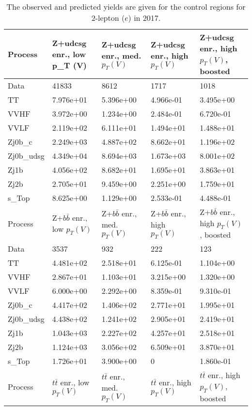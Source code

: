\begin{table}
\centering
\caption[2017 2-lepton ($e$) control region yields]{
                  The observed and predicted yields are given for the
                  control regions for 2-lepton ($e$) in 2017.
                  }
{\footnotesize
\begin{tabularx}{\textwidth}{|X|X|X|X|X|}
\hline
Process & Z+udcsg enr., low p_{T} (V) & Z+udcsg enr., med. $p_{T}(V)$ & Z+udcsg enr., high $p_{T}(V)$ & Z+udcsg enr., high $p_{T}(V)$, boosted \\
\hline
Data & 41833 & 8612 & 1717 & 1018 \\
\hline
TT & 7.976e+01 & 5.396e+00 & 4.966e-01 & 3.495e+00 \\
VVHF & 3.972e+00 & 1.234e+00 & 2.484e-01 & 6.720e-01 \\
VVLF & 2.119e+02 & 6.111e+01 & 1.494e+01 & 1.488e+01 \\
Zj0b\_c & 2.249e+03 & 4.887e+02 & 8.662e+01 & 1.196e+02 \\
Zj0b\_udsg & 4.349e+04 & 8.694e+03 & 1.673e+03 & 8.001e+02 \\
Zj1b & 4.056e+02 & 8.682e+01 & 1.695e+01 & 3.863e+01 \\
Zj2b & 2.705e+01 & 9.459e+00 & 2.251e+00 & 1.759e+01 \\
s\_Top & 8.625e+00 & 1.129e+00 & 2.533e-01 & 4.488e-01 \\
\hline
\hline
Process & Z+$b\bar{b}$ enr., low $p_{T}(V)$ & Z+$b\bar{b}$ enr., med. $p_{T}(V)$ & Z+$b\bar{b}$ enr., high $p_{T}(V)$ & Z+$b\bar{b}$ enr., high $p_{T}(V)$, boosted \\
\hline
Data & 3537 & 932 & 222 & 123 \\
\hline
TT & 4.481e+02 & 2.518e+01 & 6.125e-01 & 1.104e+00 \\
VVHF & 2.867e+01 & 1.103e+01 & 3.215e+00 & 1.320e+00 \\
VVLF & 6.000e+00 & 2.292e+00 & 8.359e-01 & 9.310e-01 \\
Zj0b\_c & 4.417e+02 & 1.406e+02 & 2.771e+01 & 1.995e+01 \\
Zj0b\_udsg & 4.438e+02 & 1.241e+02 & 2.905e+01 & 2.419e+01 \\
Zj1b & 1.043e+03 & 2.227e+02 & 4.257e+01 & 2.518e+01 \\
Zj2b & 1.124e+03 & 3.056e+02 & 6.509e+01 & 3.870e+01 \\
s\_Top & 1.726e+01 & 3.900e+00 & 0 & 1.860e-01 \\
\hline
\hline
Process & $t\bar{t}$ enr., low $p_{T}(V)$ & $t\bar{t}$ enr., med. $p_{T}(V)$ & $t\bar{t}$ enr., high $p_{T}(V)$ & $t\bar{t}$ enr., high $p_{T}(V)$, boosted \\

\end{tabularx}}
\end{table}
